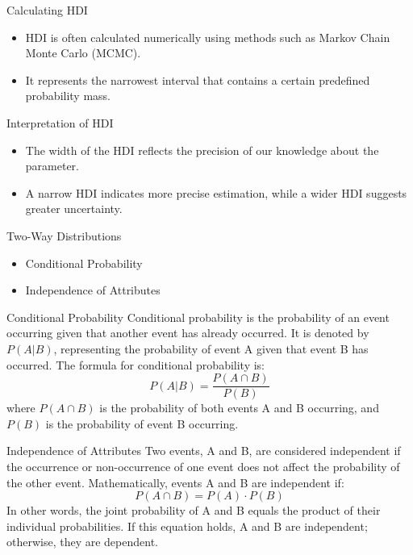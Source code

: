 \documentclass{beamer}
\begin{document}
\begin{frame}{Calculating HDI}
  \begin{itemize}
    \item HDI is often calculated numerically using methods such as Markov Chain Monte Carlo (MCMC).
    \item It represents the narrowest interval that contains a certain predefined probability mass.
  \end{itemize}
\end{frame}

\begin{frame}{Interpretation of HDI}
  \begin{itemize}
    \item The width of the HDI reflects the precision of our knowledge about the parameter.
    \item A narrow HDI indicates more precise estimation, while a wider HDI suggests greater uncertainty.
  \end{itemize}
\end{frame}



\begin{frame}{Two-Way Distributions}
  \begin{itemize}
    \item Conditional Probability
    \item Independence of Attributes
  \end{itemize}
\end{frame}

\begin{frame}{Conditional Probability}
  Conditional probability is the probability of an event occurring given that another event has already occurred. It is denoted by \( P(A | B) \), representing the probability of event A given that event B has occurred. The formula for conditional probability is:
  \[ P(A | B) = \frac{P(A \cap B)}{P(B)} \]
  where \( P(A \cap B) \) is the probability of both events A and B occurring, and \( P(B) \) is the probability of event B occurring.
\end{frame}

\begin{frame}{Independence of Attributes}
  Two events, A and B, are considered independent if the occurrence or non-occurrence of one event does not affect the probability of the other event. Mathematically, events A and B are independent if:
  \[ P(A \cap B) = P(A) \cdot P(B) \]
  In other words, the joint probability of A and B equals the product of their individual probabilities. If this equation holds, A and B are independent; otherwise, they are dependent.
\end{frame}
\end{document}
